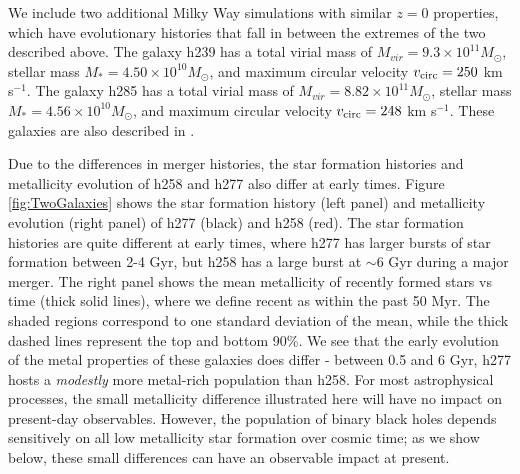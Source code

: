 \documentclass[nofootinbib,twocolumn,prd]{emulateapj}
\newcommand\msun{M_\odot}
\begin{document}
We include two additional Milky Way simulations with similar $z = 0$ properties, which have evolutionary histories that fall in between the extremes of the two described above.  The galaxy h239 has a total virial mass of $M_{vir} = 9.3 \times 10^{11}\msun$, stellar mass $M_* = 4.50 \times 10^{10}
\msun$, and maximum circular velocity $v_{\rm circ} = 250$ km s$^{-1}$.  The galaxy h285 has a total virial mass of $M_{vir} = 8.82 \times 10^{11}\msun$, stellar mass $M_* = 4.56 \times 10^{10} \msun$, and maximum circular velocity $v_{\rm circ} = 248$ km s$^{-1}$.  These galaxies are also described in \citet{Munshi13,Bellovary14}.

  Due to the differences in merger histories, the star formation histories and metallicity
  evolution of h258 and h277 also differ at early times.  Figure
  \ref{fig:TwoGalaxies} shows the star formation history (left panel) and metallicity evolution (right panel) of h277 (black) and h258 (red).  The star formation histories are quite different at early times, where h277 has larger bursts of star formation between 2-4 Gyr, but h258 has a large burst at $\sim 6$ Gyr during a major merger.   The right panel shows the mean metallicity of
  recently formed stars vs time (thick solid lines), where we define
  recent as within the past 50 Myr.  The shaded regions correspond to
  one standard deviation of the mean, while the thick dashed lines
  represent the top and bottom 90\%.  We see that the early evolution
  of the metal properties of these galaxies does differ - between 0.5
  and 6 Gyr, h277 hosts a \emph{modestly}  more metal-rich population than
  h258.   For most astrophysical processes, the small metallicity difference illustrated here will have no impact on
  present-day observables.  However,  the population of binary black holes  depends sensitively on all low metallicity star formation
  over cosmic time; as we show below, these small differences can have an observable impact at present.   
\end{document}
